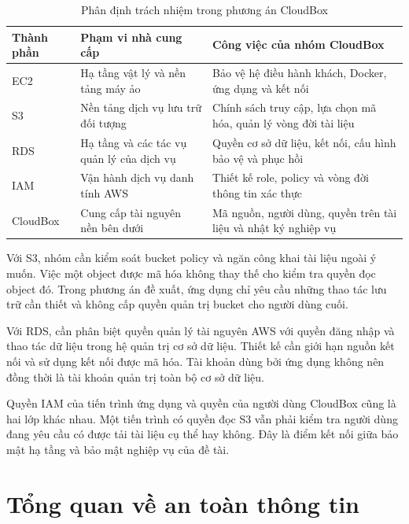 \begin{table}[htbp]
\centering\small
\caption{Phân định trách nhiệm trong phương án CloudBox}
\begin{tabularx}{\textwidth}{@{}>{\raggedright\arraybackslash}p{1.8cm}XX@{}}
\toprule
\textbf{Thành phần} & \textbf{Phạm vi nhà cung cấp} & \textbf{Công việc của nhóm CloudBox} \\
\midrule
EC2 & Hạ tầng vật lý và nền tảng máy ảo & Bảo vệ hệ điều hành khách, Docker, ứng dụng và kết nối \\
S3 & Nền tảng dịch vụ lưu trữ đối tượng & Chính sách truy cập, lựa chọn mã hóa, quản lý vòng đời tài liệu \\
RDS & Hạ tầng và các tác vụ quản lý của dịch vụ & Quyền cơ sở dữ liệu, kết nối, cấu hình bảo vệ và phục hồi \\
IAM & Vận hành dịch vụ danh tính AWS & Thiết kế role, policy và vòng đời thông tin xác thực \\
CloudBox & Cung cấp tài nguyên nền bên dưới & Mã nguồn, người dùng, quyền trên tài liệu và nhật ký nghiệp vụ \\
\bottomrule
\end{tabularx}
\end{table}

Với S3, nhóm cần kiểm soát bucket policy và ngăn công khai tài liệu ngoài ý muốn. Việc một object được mã hóa không thay thế cho kiểm tra quyền đọc object đó. Trong phương án đề xuất, ứng dụng chỉ yêu cầu những thao tác lưu trữ cần thiết và không cấp quyền quản trị bucket cho người dùng cuối.\cite{s3security}

Với RDS, cần phân biệt quyền quản lý tài nguyên AWS với quyền đăng nhập và thao tác dữ liệu trong hệ quản trị cơ sở dữ liệu. Thiết kế cần giới hạn nguồn kết nối và sử dụng kết nối được mã hóa. Tài khoản dùng bởi ứng dụng không nên đồng thời là tài khoản quản trị toàn bộ cơ sở dữ liệu.\cite{rdssecurity}

Quyền IAM của tiến trình ứng dụng và quyền của người dùng CloudBox cũng là hai lớp khác nhau. Một tiến trình có quyền đọc S3 vẫn phải kiểm tra người dùng đang yêu cầu có được tải tài liệu cụ thể hay không. Đây là điểm kết nối giữa bảo mật hạ tầng và bảo mật nghiệp vụ của đề tài.

\section{Tổng quan về an toàn thông tin}
